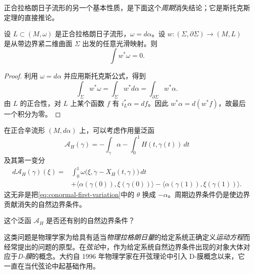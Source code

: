 正合拉格朗日子流形的另一个基本性质，是下面这个\emph{周期}消失结论；它是斯托克斯定理的直接推论。

\begin{proposition}\label{prop:exact-lagrangian-period-vanishing}
设 $L\subset(M,\omega)$ 是正合拉格朗日子流形，$\omega=d\alpha$。设
$w:(\Sigma,\partial\Sigma)\to(M,L)$ 是从带边界紧二维曲面 $\Sigma$ 出发的任意光滑映射。则
\[
 \int w^*\omega=0.
\]
\end{proposition}

\begin{proof}
利用 $\omega=d\alpha$ 并应用斯托克斯公式，得到
\[
 \int_\Sigma w^*\omega=\int_\Sigma w^*d\alpha
 =\int_{\partial\Sigma}w^*\alpha.
\]
由 $L$ 的正合性，对 $L$ 上某个函数 $f$ 有 $i_L^*\alpha=df$。因此
$w^*\alpha=d(w^*f)$，故最后一个积分为零。
\end{proof}

在正合辛流形 $(M,d\alpha)$ 上，可以考虑作用量泛函
\[
 \mathcal A_H(\gamma)=-\int_\gamma\alpha
 -\int_0^1H(t,\gamma(t))\,dt
\]
及其第一变分
\begin{equation}
\begin{split}
 d\mathcal A_H(\gamma)(\xi)
 ={}&\int_0^1\omega\bigl(\xi,\dot\gamma-X_H(t,\gamma)\bigr)\,dt\\
 &+\langle\alpha(\gamma(0)),\xi(\gamma(0))\rangle
  -\langle\alpha(\gamma(1)),\xi(\gamma(1))\rangle.
\end{split}
\label{eq:exact-action-first-variation}
\end{equation}
这无非是把\eqref{eq:conormal-first-variation}中的 $\theta$ 换成 $-\alpha$。周期边界条件仍是使边界贡献消失的自然边界条件。

\begin{question}\label{ques:other-natural-boundary}
这个泛函 $\mathcal A_H$ 是否还有别的自然边界条件？
\end{question}

\begin{remark}\label{rem:d-branes-natural-boundary}
这类问题是物理学家为给具有适当\emph{物理拉格朗日量}的给定系统正确定义\emph{运动方程}而经常提出的问题的原型。在\emph{弦论}中，作为给定系统自然边界条件出现的对象大体对应于\emph{D-膜}的概念。大约自 1996 年物理学家在开弦理论中引入 D-膜概念以来，它一直在当代弦论中起基础作用。
\end{remark}

